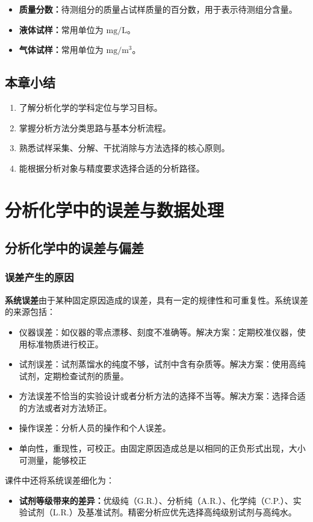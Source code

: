 \documentclass[12pt,a4paper]{article}
\numberwithin{equation}{section}
\newcommand{\summarytitle}{\subsection*{本章小结}}
\begin{document}
\begin{itemize}
    \item \textbf{质量分数：}待测组分的质量占试样质量的百分数，用于表示待测组分含量。
    \item \textbf{液体试样：}常用单位为 \(\mathrm{mg/L}\)。
    \item \textbf{气体试样：}常用单位为 \(\mathrm{mg/m^3}\)。
\end{itemize}
\summarytitle
\begin{enumerate}
    \item 了解分析化学的学科定位与学习目标。
    \item 掌握分析方法分类思路与基本分析流程。
    \item 熟悉试样采集、分解、干扰消除与方法选择的核心原则。
    \item 能根据分析对象与精度要求选择合适的分析路径。
\end{enumerate}
\newpage
\section{分析化学中的误差与数据处理}
\subsection{分析化学中的误差与偏差}
\subsubsection{误差产生的原因}
{\bf{系统误差}}由于某种固定原因造成的误差，具有一定的规律性和可重复性。系统误差的来源包括：
\begin{itemize}
\item 仪器误差：如仪器的零点漂移、刻度不准确等。解决方案：定期校准仪器，使用标准物质进行校正。
\item 试剂误差：试剂蒸馏水的纯度不够，试剂中含有杂质等。解决方案：使用高纯试剂，定期检查试剂的质量。
\item 方法误差不恰当的实验设计或者分析方法的选择不当等。解决方案：选择合适的方法或者对方法矫正。
\item 操作误差：分析人员的操作和个人误差。
\item 单向性，重现性，可校正。由固定原因造成总是以相同的正负形式出现，大小可测量，能够校正
\end{itemize}

课件中还将系统误差细化为：
\begin{itemize}
    \item \textbf{试剂等级带来的差异：}优级纯（G.R.）、分析纯（A.R.）、化学纯（C.P.）、实验试剂（L.R.）及基准试剂。精密分析应优先选择高纯级别试剂与高纯水。
\end{itemize}
\end{document}
